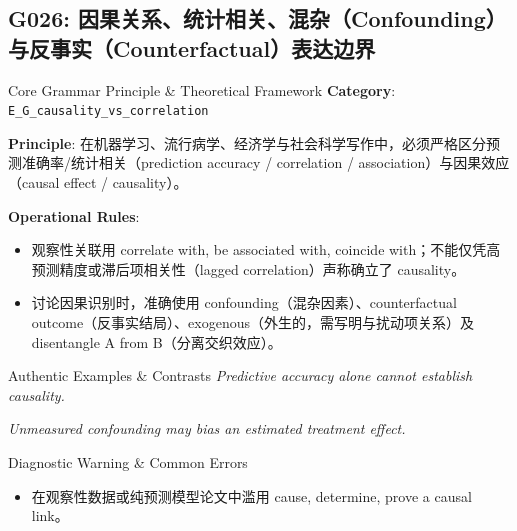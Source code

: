 \subsection{G026: 因果关系、统计相关、混杂（Confounding）与反事实（Counterfactual）表达边界}\label{sec:rule:G026}
\begin{ConceptBox}{Core Grammar Principle \& Theoretical Framework}
\textbf{Category}: \texttt{E\_G\_causality\_vs\_correlation}\par\vspace{3pt}
\textbf{Principle}: 在机器学习、流行病学、经济学与社会科学写作中，必须严格区分预测准确率/统计相关（prediction accuracy / correlation / association）与因果效应（causal effect / causality）。\par\vspace{4pt}
\textbf{Operational Rules}:
\begin{itemize}[leftmargin=1.5em, itemsep=1pt]
  \item 观察性关联用 correlate with, be associated with, coincide with；不能仅凭高预测精度或滞后项相关性（lagged correlation）声称确立了 causality。
  \item 讨论因果识别时，准确使用 confounding（混杂因素）、counterfactual outcome（反事实结局）、exogenous（外生的，需写明与扰动项关系）及 disentangle A from B（分离交织效应）。
\end{itemize}
\end{ConceptBox}
\begin{ExampleBox}{Authentic Examples \& Contrasts}
\textit{Predictive accuracy alone cannot establish causality.}\par\vspace{2pt}
\textit{Unmeasured confounding may bias an estimated treatment effect.}\par\vspace{2pt}
\end{ExampleBox}
\begin{TipBox}{Diagnostic Warning \& Common Errors}
\begin{itemize}[leftmargin=1.5em, itemsep=1pt]
  \item 在观察性数据或纯预测模型论文中滥用 cause, determine, prove a causal link。
\end{itemize}
\end{TipBox}
\vspace{6pt}
